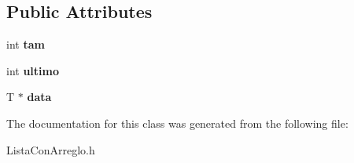 \subsection*{Public Attributes}
\begin{DoxyCompactItemize}
\item 
\hypertarget{class_lista_con_arreglo_a7b1a9c6334db75f4ffb023a95b01e3f4}{int {\bfseries tam}}\label{class_lista_con_arreglo_a7b1a9c6334db75f4ffb023a95b01e3f4}

\item 
\hypertarget{class_lista_con_arreglo_a41f052fbde3598cb6f7ec7d8412be8c3}{int {\bfseries ultimo}}\label{class_lista_con_arreglo_a41f052fbde3598cb6f7ec7d8412be8c3}

\item 
\hypertarget{class_lista_con_arreglo_af5771ddbfd5f2fbd5925cb5bae26908e}{T $\ast$ {\bfseries data}}\label{class_lista_con_arreglo_af5771ddbfd5f2fbd5925cb5bae26908e}

\end{DoxyCompactItemize}


The documentation for this class was generated from the following file\+:\begin{DoxyCompactItemize}
\item 
Lista\+Con\+Arreglo.\+h\end{DoxyCompactItemize}
